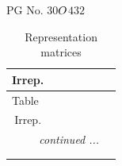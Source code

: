 \documentclass[fleqn,8pt,landscape]{jsarticle}
\begin{document}
\setcounter{MaxMatrixCols}{32}

\renewcommand{\tablename}{Table~}
\renewcommand{\figurename}{Figure~}
\begin{center}
\LARGE
PG No. 30\quad$O_{\rm }$\quad$432$\quad[ cubic ]
\end{center}
\renewcommand{\arraystretch}{1.2}
\begin{longtable}{ccccccc}
\caption{Representation matrices}
 \\
 \hline \hline
Irrep. &  &  &  &  &  &  \\ \hline \endfirsthead

\multicolumn{6}{l}{\tablename\ \thetable{}} \\
 \hline \hline
Irrep. &  &  &  &  &  &  \\ \hline \endhead

 \hline \hline
\multicolumn{6}{r}{\footnotesize\it continued ...} \\ \endfoot

 \hline \hline
\multicolumn{6}{r}{} \\ \endlastfoot


\end{longtable}
\end{document}
